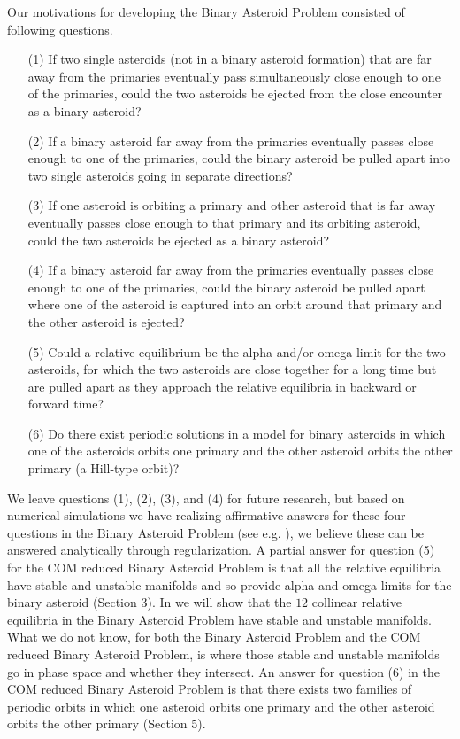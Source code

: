 \documentclass[12pt]{article}
\begin{document}
Our motivations for developing the Binary Asteroid Problem consisted of following questions.
\begin{enumerate}
    \item[(1)] If two single asteroids (not in a binary asteroid formation) that are far away from the primaries eventually pass simultaneously close enough to one of the primaries, could the two asteroids be ejected from the close encounter as a binary asteroid?
    \item[(2)] If a binary asteroid far away from the primaries eventually passes close enough to one of the primaries, could the binary asteroid be pulled apart into two single asteroids going in separate directions? 
    \item[(3)] If one asteroid is orbiting a primary and other asteroid that is far away eventually passes close enough to that primary and its orbiting asteroid, could the two asteroids be ejected as a binary asteroid?
    \item[(4)] If a binary asteroid far away from the primaries eventually passes close enough to one of the primaries, could the binary asteroid be pulled apart where one of the asteroid is captured into an orbit around that primary and the other asteroid is ejected?
    \item[(5)] Could a relative equilibrium be the alpha and/or omega limit for the two asteroids, for which the two asteroids are close together for a long time but are pulled apart as they approach the relative equilibria in backward or forward time?
    \item[(6)] Do there exist periodic solutions in a model for binary asteroids in which one of the asteroids orbits one primary and the other asteroid orbits the other primary (a Hill-type orbit)?
\end{enumerate}
We leave questions (1), (2), (3), and (4) for future research, but based on numerical simulations we have realizing affirmative answers for these four questions in the Binary Asteroid Problem (see e.g. \cite{Freeman}), we believe these can be answered analytically through regularization. A partial answer for question (5) for the COM reduced Binary Asteroid Problem is that all the relative equilibria have stable and unstable manifolds and so provide alpha and omega limits for the binary asteroid (Section 3). In \cite{Bakker} we will show that the $12$ collinear relative equilibria in the Binary Asteroid Problem have stable and unstable manifolds. What we do not know, for both the Binary Asteroid Problem and the COM reduced Binary Asteroid Problem, is where those stable and unstable manifolds go in phase space and whether they intersect. An answer for question (6) in the COM reduced Binary Asteroid Problem is that there exists two families of periodic orbits in which one asteroid orbits one primary and the other asteroid orbits the other primary (Section 5). 
\end{document}
